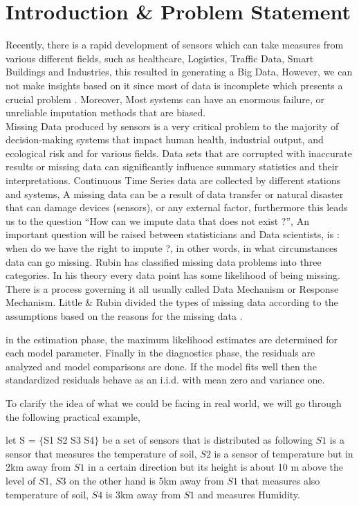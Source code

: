 \chapter{Introduction \&  Problem Statement } 

Recently, there is a rapid development of  sensors which  can take measures from various different fields, such as  healthcare, Logistics, Traffic Data, Smart Buildings and Industries, this resulted in generating a Big Data, However, we can not make insights based on it since most of data is incomplete which presents a crucial problem \cite{dempetrubin}. Moreover, Most systems can have an enormous failure, or unreliable imputation methods that are biased.\\Missing Data produced by sensors is a very  critical problem to the majority of decision-making systems that impact human health, industrial output, and ecological risk and  for various fields. Data sets that are corrupted with inaccurate results or missing data can significantly influence summary statistics and their interpretations. Continuous Time Series data are collected by different stations and systems, A missing data can be a result of data transfer or natural disaster that can damage devices (sensors), or any external factor, furthermore this leads us to the question “How can we impute data that does not exist ?”, An important question will be raised between statisticians and Data scientists, is : when do we have the right to impute ?, in other words,  in what circumstances  data can go missing. Rubin \cite{rubin} has  classified missing data problems into three categories. In his theory every data point has some likelihood of being missing. There is a process governing it all usually called Data Mechanism or Response Mechanism.
Little \& Rubin divided the types of missing data according to the assumptions based on the reasons for the missing data \cite{rubin}.

in  the estimation phase, the maximum likelihood estimates are determined for each model parameter. 
Finally in the diagnostics phase, the residuals are analyzed and model comparisons are done. If the model fits well then the standardized residuals behave as an i.i.d. with mean zero and variance one.

To clarify the idea of what we could be facing in real world, we will go through the following practical example,

let S = $\{$S1 S2 S3 S4$\}$ be a set of sensors that is distributed as following $S1$ is a sensor  that measures the temperature of soil, $S2$ is a sensor of temperature but in 2km away from $S1$ in a certain direction but its height is about 10 m above the level of $S1$, $S3$  on the other hand is 5km away from $S1$ that measures also temperature of soil,  $S4$  is 3km away from $S1$  and  measures Humidity.

